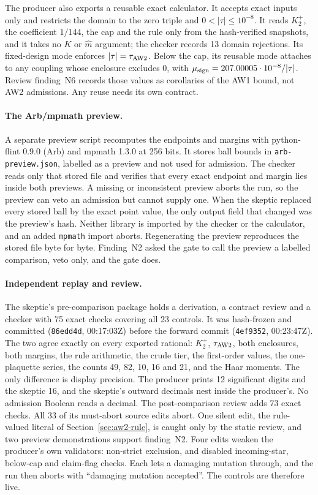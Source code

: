 The producer also exports a reusable exact calculator. It accepts exact inputs
only and restricts the domain to the zero triple and $0<|\tau|\le10^{-8}$. It
reads $K_2^+$, the coefficient $1/144$, the cap and the rule only from the
hash-verified snapshots, and it takes no $K$ or $\hat m$ argument; the checker
records 13 domain rejections. Its fixed-design mode enforces
$|\tau|=\tau_{\rm AW2}$. Below the cap, its reusable mode attaches
 to any coupling whose enclosure excludes $0$,
with $\mu_{\rm sign}=207.00005\cdot10^{-8}/|\tau|$. Review finding~N6 records
those values as corollaries of the AW1 bound, not AW2 admissions. Any reuse
needs its own contract.

\paragraph{The Arb/mpmath preview.}
A separate preview script recomputes the endpoints and margins with
python-flint 0.9.0 (Arb) and mpmath 1.3.0 at 256 bits. It stores ball bounds
in \texttt{arb-preview.json}, labelled as a preview and not used for
admission. The checker reads only that stored file and verifies that every
exact endpoint and margin lies inside both previews. A missing or
inconsistent preview aborts the run, so the preview can veto an admission but
cannot supply one. When the skeptic replaced every stored ball by the exact
point value, the only output field that changed was the preview's hash.
Neither library is imported by the checker or the calculator, and an added
\texttt{mpmath} import aborts. Regenerating the preview reproduces the stored
file byte for byte. Finding~N2 asked the gate to call the preview a labelled
comparison, veto only, and the gate does.

\paragraph{Independent replay and review.}
The skeptic's pre-comparison package holds a derivation, a contract review and
a checker with 75 exact checks covering all 23 controls. It was hash-frozen
and committed (\texttt{86edd4d}, 00:17:03Z) before the forward commit
(\texttt{4ef9352}, 00:23:47Z). The two agree exactly on every exported
rational: $K_2^+$, $\tau_{\rm AW2}$, both enclosures, both margins, the rule
arithmetic, the crude tier, the first-order values, the one-plaquette series,
the counts 49, 82, 10, 16 and 21, and the Haar moments. The only difference is
display precision. The producer prints 12 significant digits and the skeptic
16, and the skeptic's outward decimals nest inside the producer's. No
admission Boolean reads a decimal. The post-comparison review adds 73 exact
checks. All 33 of its must-abort source edits abort. One silent edit, the
rule-valued literal of Section~\ref{sec:aw2-rule}, is caught only by the
static review, and two preview demonstrations support finding~N2. Four edits
weaken the producer's own validators: non-strict exclusion, and disabled
incoming-star, below-cap and claim-flag checks. Each lets a damaging mutation
through, and the run then aborts with ``damaging mutation accepted''. The
controls are therefore live.

